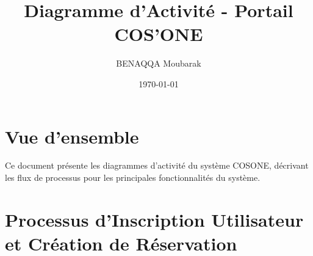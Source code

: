 \documentclass[12pt,a4paper]{article}
\title{\textbf{Diagramme d'Activité - Portail COS'ONE}}
\author{BENAQQA Moubarak}
\date{\today}
\begin{document}
\maketitle

\section{Vue d'ensemble}

Ce document présente les diagrammes d'activité du système COSONE, décrivant les flux de processus pour les principales fonctionnalités du système.

\section{Processus d'Inscription Utilisateur et Création de Réservation}
\end{document}

